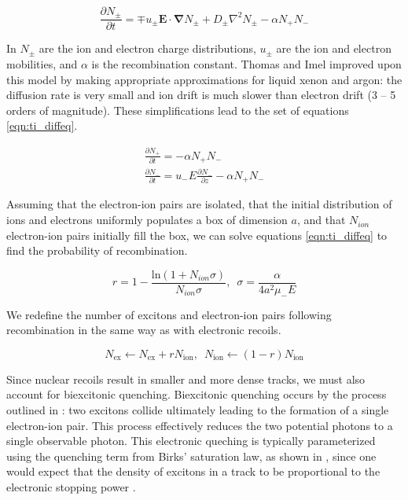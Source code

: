\begin{equation}
        \label{eqn:jaffe_recomb}
        \frac{\partial N_{\pm}}{\partial t} = \mp u_{\pm} \bm{E} \cdot \bm{\nabla} N_{\pm} + D_{\pm} \nabla^2 N_{\pm} - \alpha N_+ N_-
\end{equation}

In  $N_{\pm}$ are the ion and electron charge distributions, $u_{\pm}$ are the ion and electron mobilities, and $\alpha$ is the recombination constant.  Thomas and Imel improved upon this model by making appropriate approximations for liquid xenon and argon: the diffusion rate is very small and ion drift is much slower than electron drift (3 -- 5 orders of magnitude).  These simplifications lead to the set of equations \ref{eqn:ti_diffeq}.

\begin{equation}
        \label{eqn:ti_diffeq}
        \begin{gathered}
                \frac{\partial N_+}{\partial t} = - \alpha N_+ N_- \\
                \frac{\partial N_-}{\partial t} = u_- E \frac{\partial N_-}{\partial z} - \alpha N_+ N_-
        \end{gathered}
\end{equation}

Assuming that the electron-ion pairs are isolated, that the initial distribution of ions and electrons uniformly populates a box of dimension $a$, and that $N_{ion}$ electron-ion pairs initially fill the box, we can solve equations \ref{eqn:ti_diffeq} to find the probability of recombination.

\begin{equation}
        \label{eqn:ti_recomb}
        r = 1 - \frac{\textrm{ln}(1 + N_{ion} \sigma)}{N_{ion} \sigma}, \, \, \, \sigma = \frac{\alpha}{4 a^2 \mu_- E}
\end{equation}

We redefine the number of excitons and electron-ion pairs following recombination in the same way as with electronic recoils.

\begin{equation}
        N_{\textrm{ex}} \leftarrow N_{\textrm{ex}} + r N_{\textrm{ion}}, \, \, \, N_{\textrm{ion}} \leftarrow (1 - r) N_{\textrm{ion}}
\end{equation}

Since nuclear recoils result in smaller and more dense tracks, we must also account for biexcitonic quenching.  Biexcitonic quenching occurs by the process outlined in : two excitons collide ultimately leading to the formation of a single electron-ion pair.  This process effectively reduces the two potential photons to a single observable photon.  This electronic queching is typically parameterized using the quenching term from Birks' saturation law, as shown in , since one would expect that the density of excitons in a track to be proportional to the electronic stopping power \cite{mei2008model, tretyak2010semi, bezrukov2011interplay}. 

